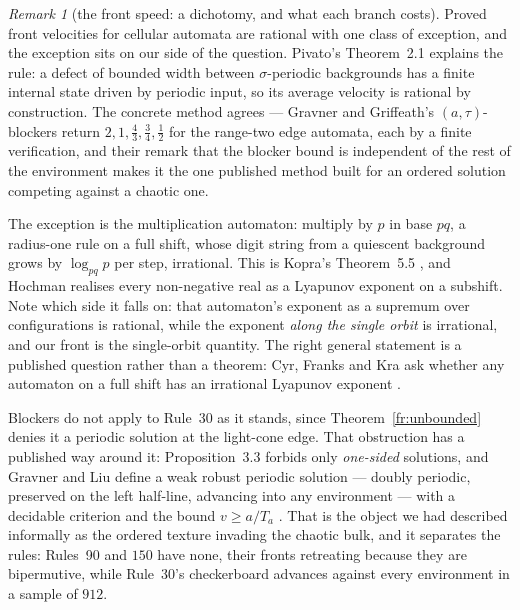 \documentclass[11pt]{article}
\theoremstyle{definition}
\theoremstyle{remark}
\newtheorem{remark}[theorem]{Remark}
\begin{document}
\begin{remark}[the front speed: a dichotomy, and what each branch costs]\label{fr:rational}
Proved front velocities for cellular automata are rational with one class of exception, and the
exception sits on our side of the question. Pivato's Theorem~2.1 \cite{PivatoDefect} explains the rule:
a defect of bounded width between $\sigma$-periodic backgrounds has a finite internal state driven by
periodic input, so its average velocity is rational by construction. The concrete method agrees ---
Gravner and Griffeath's $(a,\tau)$-blockers \cite[Props.~5.1, 5.2]{GG} return
$2,1,\tfrac43,\tfrac34,\tfrac12$ for the range-two edge automata, each by a finite verification, and
their remark that the blocker bound is independent of the rest of the environment makes it the one
published method built for an ordered solution competing against a chaotic one.

The exception is the multiplication automaton: multiply by $p$ in base $pq$, a radius-one rule on a
full shift, whose digit string from a quiescent background grows by $\log_{pq}p$ per step, irrational.
This is Kopra's Theorem~5.5 \cite{Kopra2020}, and Hochman realises every non-negative real as a
Lyapunov exponent on a subshift. Note which side it falls on: that automaton's exponent as a supremum
over configurations is rational, while the exponent \emph{along the single orbit} is irrational, and our
front is the single-orbit quantity. The right general statement is a published question rather than a
theorem: Cyr, Franks and Kra ask whether any automaton on a full shift has an irrational Lyapunov
exponent \cite[Question~5.7]{CFK}.

Blockers do not apply to Rule~30 as it stands, since Theorem~\ref{fr:unbounded} denies it a periodic
solution at the light-cone edge. That obstruction has a published way around it: Proposition~3.3
forbids only \emph{one-sided} solutions, and Gravner and Liu define a weak robust periodic solution ---
doubly periodic, preserved on the left half-line, advancing into any environment --- with a decidable
criterion and the bound $v\ge a/T_a$ \cite{GL23}. That is the object we had described informally as the
ordered texture invading the chaotic bulk, and it separates the rules: Rules~90 and $150$ have none,
their fronts retreating because they are bipermutive, while Rule~30's checkerboard advances against
every environment in a sample of $912$.


\end{remark}
\end{document}

